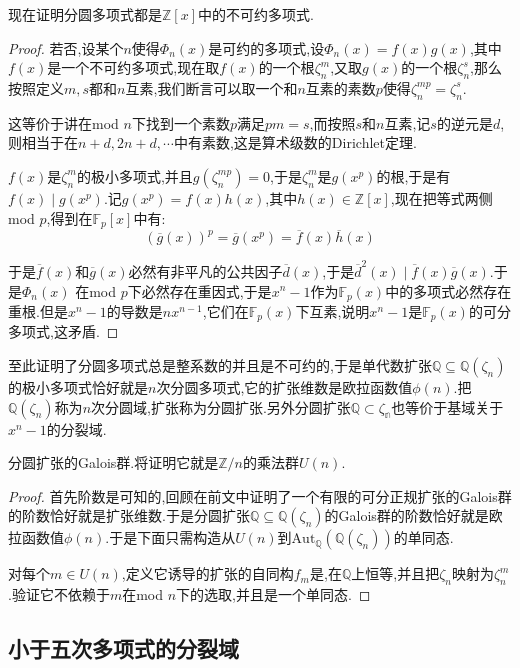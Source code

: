 现在证明分圆多项式都是$\mathbb{Z}[x]$中的不可约多项式.
\begin{proof}
	
	若否,设某个$n$使得$\Phi_n(x)$是可约的多项式,设$\Phi_n(x)=f(x)g(x)$,其中$f(x)$是一个不可约多项式,现在取$f(x)$的一个根$\zeta_n^{m}$,又取$g(x)$的一个根$\zeta_n^s$,那么按照定义$m,s$都和$n$互素,我们断言可以取一个和$n$互素的素数$p$使得$\zeta_n^{mp}=\zeta_n^{s}$. 
	
	这等价于讲在mod $n$下找到一个素数$p$满足$pm=s$,而按照$s$和$n$互素,记$s$的逆元是$d$,则相当于在$n+d,2n+d,\cdots$中有素数,这是算术级数的Dirichlet定理.
	
	$f(x)$是$\zeta_n^m$的极小多项式,并且$g(\zeta_n^{mp})=0$,于是$\zeta_n^{m}$是$g(x^p)$的根,于是有$f(x)\mid g(x^p)$.记$g(x^p)=f(x)h(x)$,其中$h(x)\in\mathbb{Z}[x]$,现在把等式两侧mod $p$,得到在$\mathbb{F}_p[x]$中有:
	$$\left(\overline{g}(x)\right)^p=\overline{g}(x^p)=\overline{f}(x)\overline{h}(x)$$
	
	于是$\overline{f}(x)$和$\overline{g}(x)$必然有非平凡的公共因子$\overline{d}(x)$,于是$\overline{d}^2(x)\mid\overline{f}(x)\overline{g}(x)$.于是$\Phi_n(x)$ 在mod $p$下必然存在重因式,于是$x^n-1$作为$\mathbb{F}_p(x)$中的多项式必然存在重根.但是$x^n-1$的导数是$nx^{n-1}$,它们在$\mathbb{F}_p(x)$下互素,说明$x^n-1$是$\mathbb{F}_p(x)$的可分多项式,这矛盾.
\end{proof}

至此证明了分圆多项式总是整系数的并且是不可约的,于是单代数扩张$\mathbb{Q}\subseteq \mathbb{Q}(\zeta_n)$的极小多项式恰好就是$n$次分圆多项式,它的扩张维数是欧拉函数值$\phi(n)$.把$\mathbb{Q}(\zeta_n)$称为$n$次分圆域,扩张称为分圆扩张.另外分圆扩张$\mathbb{Q}\subset\mathbb{\zeta_n}$也等价于基域关于$x^n-1$的分裂域.

分圆扩张的Galois群.将证明它就是$\mathbb{Z}/n$的乘法群$U(n)$.
\begin{proof}
	
	首先阶数是可知的,回顾在前文中证明了一个有限的可分正规扩张的Galois群的阶数恰好就是扩张维数.于是分圆扩张$\mathbb{Q}\subseteq \mathbb{Q}(\zeta_n)$的Galois群的阶数恰好就是欧拉函数值$\phi(n)$.于是下面只需构造从$U(n)$到$\mathrm{Aut}_{\mathbb{Q}}(\mathbb{Q}(\zeta_n))$的单同态.
	
	对每个$m\in U(n)$,定义它诱导的扩张的自同构$f_m$是,在$\mathbb{Q}$上恒等,并且把$\zeta_n$映射为$\zeta_n^m$.验证它不依赖于$m$在mod $n$下的选取,并且是一个单同态.
\end{proof}
\newpage
\subsection{小于五次多项式的分裂域}

